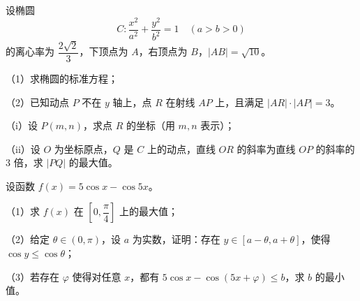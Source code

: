 \documentclass[zihao=-4]{exam-zh}
\begin{document}
\begin{problem}[points=17]
设椭圆
\[
C:\frac{x^2}{a^2}+\frac{y^2}{b^2}=1\quad(a>b>0)
\]
的离心率为 $\dfrac{2\sqrt2}{3}$，下顶点为 $A$，右顶点为 $B$，$|AB|=\sqrt{10}$。

（1）求椭圆的标准方程；

（2）已知动点 $P$ 不在 $y$ 轴上，点 $R$ 在射线 $AP$ 上，且满足 $|AR|\cdot |AP|=3$。

（i）设 $P(m,n)$，求点 $R$ 的坐标（用 $m,n$ 表示）；

（ii）设 $O$ 为坐标原点，$Q$ 是 $C$ 上的动点，直线 $OR$ 的斜率为直线 $OP$ 的斜率的 $3$ 倍，求 $|PQ|$ 的最大值。
\end{problem}

\begin{problem}[points=17]
设函数 $f(x)=5\cos x-\cos 5x$。

（1）求 $f(x)$ 在 $\left[0,\dfrac{\pi}{4}\right]$ 上的最大值；

（2）给定 $\theta\in(0,\pi)$，设 $a$ 为实数，证明：存在 $y\in[a-\theta,a+\theta]$，使得 $\cos y\leq \cos\theta$；

（3）若存在 $\varphi$ 使得对任意 $x$，都有 $5\cos x-\cos(5x+\varphi)\leq b$，求 $b$ 的最小值。
\end{problem}
\end{document}
